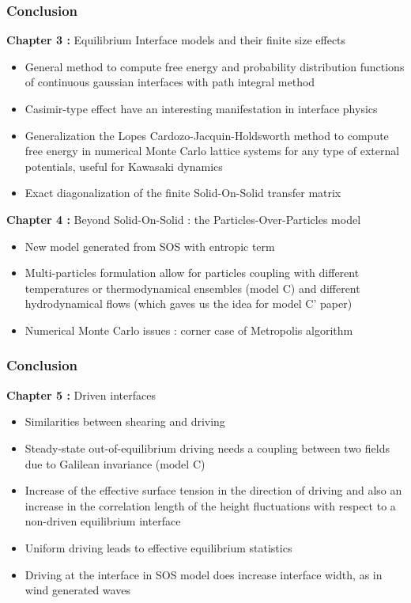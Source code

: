 \documentclass[9pt, dvipsnames,aspectratio=169]{beamer} %
\begin{document}
\begin{frame}
	\frametitle{Conclusion}
	\begin{block}{{\bf Chapter 3 :} Equilibrium Interface models and their finite size effects}
	\begin{itemize}
		\item General method to compute free energy and probability distribution functions of continuous gaussian interfaces with path integral method
		\item Casimir-type effect have an interesting manifestation in interface physics		
		\item Generalization the Lopes Cardozo-Jacquin-Holdsworth method to compute free energy in numerical Monte Carlo lattice systems for any type of external potentials, useful for Kawasaki dynamics
		\item Exact diagonalization of the finite Solid-On-Solid transfer matrix
	\end{itemize}
	\end{block}
	\begin{block}{{\bf Chapter 4 :} Beyond Solid-On-Solid : the Particles-Over-Particles model}
	\begin{itemize}
		\item New model generated from SOS with entropic term
		\item Multi-particles formulation  allow for particles coupling with different temperatures or thermodynamical ensembles (model C) and different hydrodynamical flows (which gaves us the idea for model C' paper)
		\item Numerical Monte Carlo issues : corner case of Metropolis algorithm
	\end{itemize}
	\end{block}	
\end{frame}


\begin{frame}
    \frametitle{Conclusion}
    \begin{block}{{\bf Chapter 5 :} Driven interfaces}
    \begin{itemize}
    	\item Similarities between shearing and driving
    	\item Steady-state out-of-equilibrium driving needs a coupling between two fields due to Galilean invariance (model C)
        \item Increase of the effective surface tension in the direction of driving and also an increase in the correlation length of the height fluctuations with respect to a non-driven equilibrium interface
        \item Uniform driving leads to effective equilibrium statistics
        \item Driving at the interface in SOS model does increase interface width, as in wind generated waves        
    \end{itemize}
    \end{block}
\end{frame} 
\end{document}
